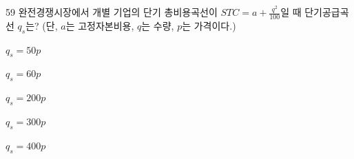 \begin{question}{59}
완전경쟁시장에서 개별 기업의 단기 총비용곡선이 $STC=a+\frac{q^{2}}{100}$일 때 단기공급곡선 $q_{s}$는? (단, $a$는 고정자본비용, $q$는 수량, $p$는 가격이다.)
\begin{choices}
  \item $q_{s}=50p$
  \item $q_{s}=60p$
  \item $q_{s}=200p$
  \item $q_{s}=300p$
  \item $q_{s}=400p$
\end{choices}
\end{question}
